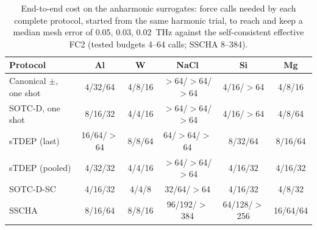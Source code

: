 \begin{table}[t]
\caption{End-to-end cost on the anharmonic surrogates: force calls needed by each complete protocol, started from the same harmonic trial, to reach and keep a median mesh error of 0.05, 0.03, 0.02~THz against the self-consistent effective FC2 (tested budgets 4--64 calls; SSCHA 8--384).}
\label{tab:calls}
\begin{ruledtabular}
\begin{tabular}{lccccc}
Protocol & Al & W & NaCl & Si & Mg\\
\hline
Canonical $\pm$, one shot & 4/32/64 & 4/8/16 & $>$64/$>$64/$>$64 & 4/16/$>$64 & 4/8/16\\
SOTC-D, one shot & 8/16/32 & 4/4/16 & $>$64/$>$64/$>$64 & 4/16/$>$64 & 4/8/64\\
sTDEP (last) & 16/64/$>$64 & 8/8/64 & 64/$>$64/$>$64 & 8/32/64 & 8/16/64\\
sTDEP (pooled) & 4/32/32 & 4/4/16 & $>$64/$>$64/$>$64 & 4/16/32 & 4/16/32\\
SOTC-D-SC & 4/16/32 & 4/4/8 & 32/64/$>$64 & 4/16/32 & 4/8/32\\
SSCHA & 8/16/64 & 8/8/16 & 96/192/$>$384 & 64/128/$>$256 & 16/64/64\\
\end{tabular}
\end{ruledtabular}
\end{table}
